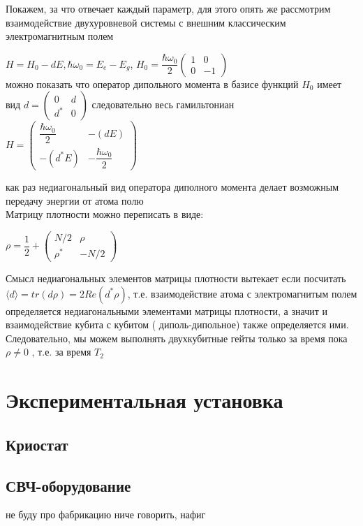 \documentclass[12pt, twoside]{report}
\begin{document}
Покажем, за что отвечает каждый параметр, для этого опять же рассмотрим взаимодействие двухуровневой системы с внешним классическим электромагнитным полем
\begin{center}
$H=H_0-dE, \hbar\omega_0=E_e-E_g$,
$H_0=\dfrac{\hbar\omega_0}{2}\begin{pmatrix} 1&0\\  0& -1\end{pmatrix}$\\
можно показать что оператор дипольного момента в базисе  функций $H_0$ имеет вид $d=\begin{pmatrix} 0&d\\  d^*& 0\end{pmatrix}$ следовательно весь гамильтониан 
$H=\begin{pmatrix} \dfrac{\hbar\omega_0}{2}&-(dE)\\  -(d^*E)& -\dfrac{\hbar\omega_0}{2}\end{pmatrix}$
\end{center}
как раз недиагональный вид оператора диполного момента делает возможным передачу энергии от атома полю\\
Матрицу плотности можно переписать в виде:
\begin{center}
$\rho = \dfrac{1}{2}+\begin{pmatrix} N/2&\rho\\  \rho^*& -N/2 \end{pmatrix}$
\end{center}
Смысл недиагональных элементов матрицы плотности вытекает если посчитать $\langle d \rangle = tr(d\rho)=2Re(d^*\rho)$, т.е. взаимодействие атома с электромагнитым полем определяется недиагональными элементами матрицы плотности, а значит и взаимодействие кубита с кубитом ( диполь-дипольное) также определяется ими. Следовательно, мы можем выполнять двухкубитные гейты только за время пока $\rho \neq 0$ , т.е. за время $T_2$

		


\newpage

	\section{Экспериментальная установка}
		\subsection{Криостат}
		\subsection{СВЧ-оборудование}
не буду про фабрикацию ниче говорить, нафиг
\end{document}
